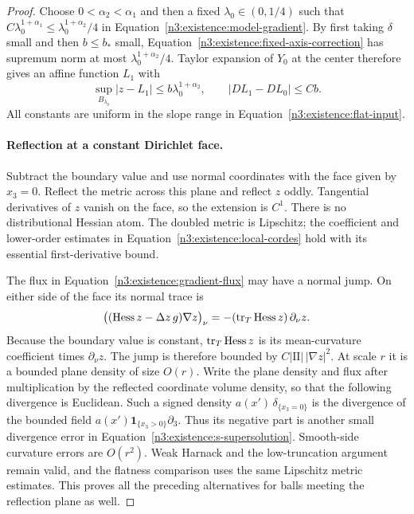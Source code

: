 \begin{proof}
Choose $0<\alpha_2<\alpha_1$ and then a fixed
$\lambda_0\in(0,1/4)$ such that
$C\lambda_0^{1+\alpha_1}\le\lambda_0^{1+\alpha_2}/4$ in
Equation~\eqref{n3:existence:model-gradient}.  By first taking
$\delta$ small and then $b\le b_*$ small,
Equation~\eqref{n3:existence:fixed-axis-correction} has supremum norm
at most $\lambda_0^{1+\alpha_2}/4$.  Taylor expansion of $Y_0$
at the center therefore gives an affine function $L_1$ with
\begin{equation}\label{n3:existence:improved-flatness}
 \sup_{B_{\lambda_0}}|z-L_1|
 \le b\lambda_0^{1+\alpha_2},\qquad
 |DL_1-DL_0|\le Cb.
\end{equation}
All constants are uniform in the slope range in
Equation~\eqref{n3:existence:flat-input}.

\paragraph{Reflection at a constant Dirichlet face.}
Subtract the boundary value and use normal coordinates with the face
given by $x_3=0$.  Reflect the metric across this plane and reflect
$z$ oddly.  Tangential derivatives of $z$ vanish on the face, so
the extension is $C^1$.  There is no distributional Hessian atom.
The doubled metric is Lipschitz; the coefficient and lower-order
estimates in Equation~\eqref{n3:existence:local-cordes} hold with its
essential first-derivative bound.

The flux in Equation~\eqref{n3:existence:gradient-flux} may have a
normal jump.  On either side of the face its normal trace is
\begin{equation}\label{n3:existence:reflected-flux}
 \bigl((\operatorname{Hess} z-\Delta z\,g)\nabla z\bigr)_\nu
   =-(\operatorname{tr}_T\operatorname{Hess} z)\,\partial_\nu z.
\end{equation}
Because the boundary value is constant, $\operatorname{tr}_T\operatorname{Hess} z$ is its
mean-curvature coefficient times $\partial_\nu z$.  The jump is
therefore bounded by $C|\mathrm{II}|\,|\nabla z|^2$.  At scale
$r$ it is a bounded plane density of size $O(r)$.  Write the plane
density and flux after multiplication by the reflected coordinate
volume density, so that the following divergence is Euclidean.
Such a signed density $a(x')\,\delta_{\{x_3=0\}}$ is the divergence of the
bounded field $a(x')\mathbf 1_{\{x_3>0\}}\partial_3$.
Thus its negative part is another small divergence error in
Equation~\eqref{n3:existence:s-supersolution}.  Smooth-side curvature
errors are $O(r^2)$.  Weak Harnack and the low-truncation argument
remain valid, and the flatness comparison uses the same Lipschitz
metric estimates.  This proves all the preceding alternatives for
balls meeting the reflection plane as well.


\end{proof}
